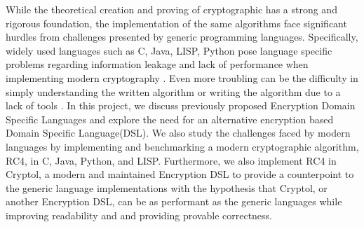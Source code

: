 While the theoretical creation and proving of cryptographic has a strong and rigorous foundation, the implementation of the same algorithms face significant hurdles from challenges presented by generic programming languages. Specifically, widely used languages such as C, Java, LISP, Python pose language specific problems regarding information leakage and lack of performance when implementing modern cryptography \cite{Lewis}. Even more troubling can be the difficulty in simply understanding the written algorithm or writing the algorithm due to a lack of tools \cite{Agosta}. In this project, we discuss previously proposed Encryption Domain Specific Languages and explore the need for an alternative encryption based Domain Specific Language(DSL).  We also study the challenges faced by modern languages by implementing and benchmarking a modern cryptographic algorithm, RC4, in C, Java, Python, and LISP. Furthermore, we also implement RC4 in Cryptol, a modern and maintained Encryption DSL to provide a counterpoint to the generic language implementations with the hypothesis that Cryptol, or another Encryption DSL, can be as performant as the generic languages while improving readability and and providing provable correctness.
